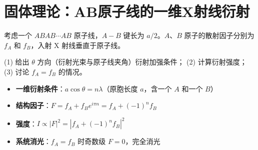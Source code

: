 \section{固体理论：AB原子线的一维X射线衍射}
\label{sec:ab-chain-diffraction}

\begin{modelbox}
考虑一个 $ABAB\cdots AB$ 原子线，$A-B$ 键长为 $a/2$。$A$、$B$ 原子的散射因子分别为 $f_A$ 和 $f_B$，入射 X 射线垂直于原子线。

(1) 给出 $\theta$ 方向（衍射光束与原子线夹角）衍射加强条件；
(2) 计算衍射强度；
(3) 讨论 $f_A=f_B$ 的情况。
\end{modelbox}

\begin{tipbox}[考点快速分析]
\begin{itemize}
    \item \textbf{一维衍射条件}：$a\cos\theta=n\lambda$（原胞长度 $a$，含一个 $A$ 和一个 $B$）
    \item \textbf{结构因子}：$F=f_A+f_Be^{i\pi n}=f_A+(-1)^nf_B$
    \item \textbf{强度}：$I\propto|F|^2=|f_A+(-1)^nf_B|^2$
    \item \textbf{系统消光}：$f_A=f_B$ 时奇数级 $F=0$，完全消光
\end{itemize}
\end{tipbox}

